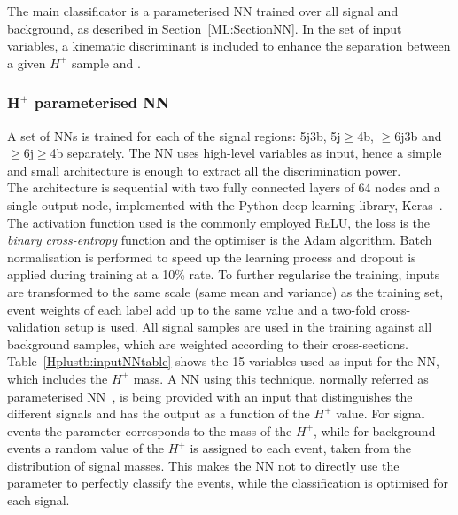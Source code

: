 The main classificator is a parameterised NN trained over all signal and background, as described in Section~\ref{ML:SectionNN}. In the set of input variables, a kinematic discriminant is included to enhance the separation between a given $H^+$ sample and \ttjets.

\subsubsection{$\bm{H^+}$ parameterised NN}
\label{sec:HplusPNN}
A set of NNs is trained for each of the signal regions: 5j3b, 5j$\geq$4b, $\geq$6j3b and $\geq$6j$\geq$4b separately. The NN uses high-level variables as input, hence a simple and small architecture is enough to extract all the discrimination power.\\

The architecture is sequential with two fully connected layers of 64 nodes and a single output node, implemented with the Python deep learning library, Keras~\cite{chollet2015keras}. The activation function used is the commonly employed \textsc{ReLU}, the loss is the \textit{binary cross-entropy} function and the optimiser is the Adam algorithm. Batch normalisation is performed to speed up the learning process and dropout is applied during training at a 10\% rate. To further regularise the training, inputs are transformed to the same scale (same mean and variance) as the training set, event weights of each label add up to the same value and a two-fold cross-validation setup is used. All signal samples are used in the training against all background samples, which are weighted according to their cross-sections. Table~\ref{Hplustb:inputNNtable} shows the 15 variables used as input for the NN, which includes the $H^+$ mass. A NN using this technique, normally referred as parameterised NN~\cite{Baldi_2016}, is being provided with an input that distinguishes the different signals and has the output as a function of the $H^+$ value. For signal events the parameter corresponds to the mass of the $H^+$, while for background events a random value of the $H^+$ is assigned to each event, taken from the distribution of signal masses. This makes the NN not to directly use the parameter to perfectly classify the events, while the classification is optimised for each signal.\\

